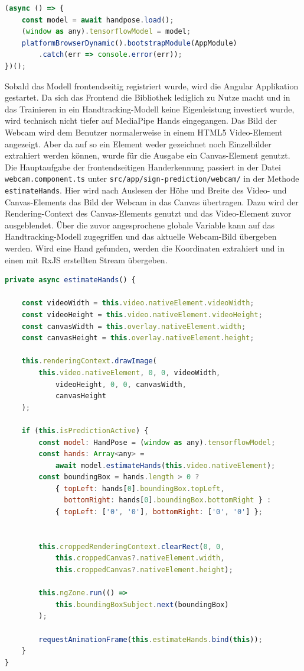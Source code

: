 \documentclass[11pt,bibliography=totocnumbered]{scrartcl}
\begin{document}
\begin{lstlisting}[language=javascript,firstnumber=16,caption={Laden der frontendseitigen MediaPipe Hands Modelle.},label=lst:loading_mediapipe_hands_models]
(async () => {
	const model = await handpose.load();
	(window as any).tensorflowModel = model;
	platformBrowserDynamic().bootstrapModule(AppModule)
		.catch(err => console.error(err));
})();
\end{lstlisting}
Sobald das Modell frontendseitig registriert wurde, wird die Angular Applikation gestartet. Da sich das Frontend die Bibliothek lediglich zu Nutze macht und in das Trainieren in ein Handtracking-Modell keine Eigenleistung investiert wurde, wird technisch nicht tiefer auf MediaPipe Hands eingegangen. Das Bild der Webcam wird dem Benutzer normalerweise in einem HTML5 Video-Element angezeigt. Aber da auf so ein Element weder gezeichnet noch Einzelbilder extrahiert werden können, wurde für die Ausgabe ein Canvas-Element genutzt. Die Hauptaufgabe der frontendseitigen Handerkennung passiert in der Datei \lstinline[language=pythoninline]|webcam.component.ts| unter \lstinline[language=pythoninline]|src/app/sign-prediction/webcam/| in der Methode \lstinline[language=pythoninline]|estimateHands|. Hier wird nach Auslesen der Höhe und Breite des Video- und Canvas-Elements das Bild der Webcam in das Canvas übertragen. Dazu wird der Rendering-Context des Canvas-Elements genutzt und das Video-Element zuvor ausgeblendet. Über die zuvor angesprochene globale Variable kann auf das Handtracking-Modell zugegriffen und das aktuelle Webcam-Bild übergeben werden. Wird eine Hand gefunden, werden die Koordinaten extrahiert und in einen mit RxJS erstellten Stream übergeben.
\begin{lstlisting}[language=javascript,firstnumber=124,caption={Erkennen einer Hand mit MediaPipe Hands.},label=lst:estimate_hands]
private async estimateHands() {

	const videoWidth = this.video.nativeElement.videoWidth;
	const videoHeight = this.video.nativeElement.videoHeight;
	const canvasWidth = this.overlay.nativeElement.width;
	const canvasHeight = this.overlay.nativeElement.height;
	
	this.renderingContext.drawImage(
		this.video.nativeElement, 0, 0, videoWidth, 
			videoHeight, 0, 0, canvasWidth,
			canvasHeight
	);
	
	if (this.isPredictionActive) {
		const model: HandPose = (window as any).tensorflowModel;
		const hands: Array<any> = 
			await model.estimateHands(this.video.nativeElement);
		const boundingBox = hands.length > 0 ?
			{ topLeft: hands[0].boundingBox.topLeft, 
			  bottomRight: hands[0].boundingBox.bottomRight } :
			{ topLeft: ['0', '0'], bottomRight: ['0', '0'] };
	
	
		this.croppedRenderingContext.clearRect(0, 0,
			this.croppedCanvas?.nativeElement.width,
			this.croppedCanvas?.nativeElement.height);
			
		this.ngZone.run(() =>
			this.boundingBoxSubject.next(boundingBox)
		);
	
		requestAnimationFrame(this.estimateHands.bind(this));
	}
}
\end{lstlisting}
\end{document}
